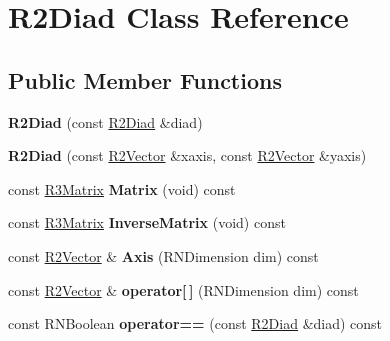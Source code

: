 \hypertarget{class_r2_diad}{}\section{R2\+Diad Class Reference}
\label{class_r2_diad}
\subsection*{Public Member Functions}
\begin{DoxyCompactItemize}
\item 
{\bfseries R2\+Diad} (const \hyperlink{class_r2_diad}{R2\+Diad} \&diad)\hypertarget{class_r2_diad_abb68c6884b7c3a682cbf83c26b4d7066}{}\label{class_r2_diad_abb68c6884b7c3a682cbf83c26b4d7066}

\item 
{\bfseries R2\+Diad} (const \hyperlink{class_r2_vector}{R2\+Vector} \&xaxis, const \hyperlink{class_r2_vector}{R2\+Vector} \&yaxis)\hypertarget{class_r2_diad_ae6d1d1daf2b9cdae29aaf3b750715d48}{}\label{class_r2_diad_ae6d1d1daf2b9cdae29aaf3b750715d48}

\item 
const \hyperlink{class_r3_matrix}{R3\+Matrix} {\bfseries Matrix} (void) const \hypertarget{class_r2_diad_a2d8f6d127bc8a123171680a5eafcd61c}{}\label{class_r2_diad_a2d8f6d127bc8a123171680a5eafcd61c}

\item 
const \hyperlink{class_r3_matrix}{R3\+Matrix} {\bfseries Inverse\+Matrix} (void) const \hypertarget{class_r2_diad_a6673cdcb760c501ff9735b35e55d7fa0}{}\label{class_r2_diad_a6673cdcb760c501ff9735b35e55d7fa0}

\item 
const \hyperlink{class_r2_vector}{R2\+Vector} \& {\bfseries Axis} (R\+N\+Dimension dim) const \hypertarget{class_r2_diad_aab24b633fd70dcb173bd7de1f35cf198}{}\label{class_r2_diad_aab24b633fd70dcb173bd7de1f35cf198}

\item 
const \hyperlink{class_r2_vector}{R2\+Vector} \& {\bfseries operator\mbox{[}$\,$\mbox{]}} (R\+N\+Dimension dim) const \hypertarget{class_r2_diad_a9ea4e168f2de5716ac151ed042488952}{}\label{class_r2_diad_a9ea4e168f2de5716ac151ed042488952}

\item 
const R\+N\+Boolean {\bfseries operator==} (const \hyperlink{class_r2_diad}{R2\+Diad} \&diad) const \hypertarget{class_r2_diad_a2ee8bc22300b8014c2450dc4fa81d795}{}\label{class_r2_diad_a2ee8bc22300b8014c2450dc4fa81d795}


\end{DoxyCompactItemize}

